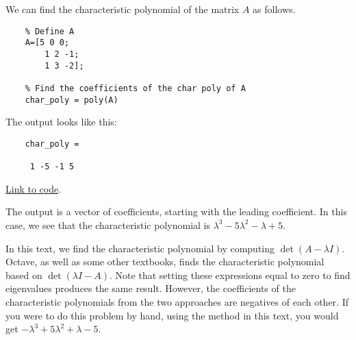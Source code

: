 \documentclass{ximera}
\begin{document}
    \begin{template}\label{temp:charPoly}
        We can find the characteristic polynomial of the matrix $A$ as follows.
    
        \begin{verbatim}
    % Define A
    A=[5 0 0; 
        1 2 -1; 
        1 3 -2];
    
    % Find the coefficients of the char poly of A
    char_poly = poly(A)
        \end{verbatim}
    
    The output looks like this:
    
    \begin{verbatim}
    char_poly =
    
     1 -5 -1 5
    \end{verbatim}
    
    \href{https://sagecell.sagemath.org/?z=eJxTVXBJTcvMS1Vw5OVytI02VTBQMLBW4OVSAAJDBSMFXUMEz1hB1yjWmpeLl0tVwS0zL0WhJCNVITk_NS0tMzkzNa-kWCE_DSKWkVikUJCfUwkSABoM4seD-bZgYQ1HTQCF1h-X&lang=octave&interacts=eJyLjgUAARUAuQ==}{Link to code}.
    
    The output is a vector of coefficients, starting with the leading coefficient.  In this case, we see that the characteristic polynomial is $\lambda^3-5\lambda^2-\lambda+5$.
    
    \begin{warning}
        In this text, we find the characteristic polynomial by computing $\det{\left(A-\lambda I\right)}$.  Octave, as well as some other textbooks, finds the characteristic polynomial based on $\det{\left(\lambda I-A\right)}$.  Note that setting these expressions equal to zero to find eigenvalues produces the same result. However, the coefficients of the characteristic polynomials from the two approaches are negatives of each other.  If you were to do this problem by hand, using the method in this text, you would get $-\lambda^3+5\lambda^2+\lambda-5$.
    \end{warning}
    \end{template}
\end{document}
